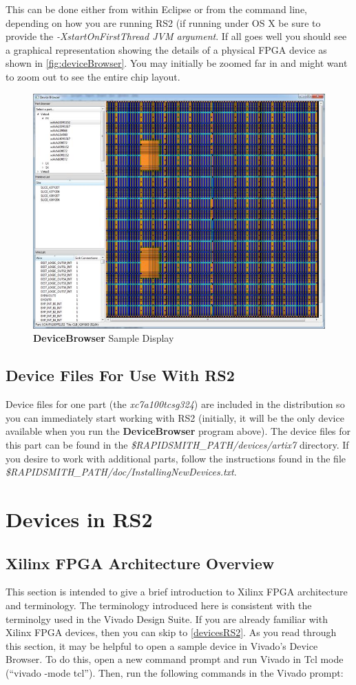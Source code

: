\documentclass[10pt]{article}
\newcommand{\fil}[1]{{\em #1}}
\newcommand{\opt}[1]{{\em #1}}
\newcommand{\pgm}[1]{{\textbf{#1}}}
\newcommand{\dir}[1]{{\em #1}}
\begin{document}
\noindent This can be done either from within Eclipse or from the command line,
depending on how you are running RS2 (if running under OS X be sure to provide the
\opt{-XstartOnFirstThread JVM argument}. If all goes well you should see a
graphical representation showing the details of a physical FPGA device as shown
in \autoref{fig:deviceBrowser}.  You may initially be zoomed far in and might
want to zoom out to see the entire chip layout.

\begin{figure}[H]
\centering
\includegraphics[width=0.8\columnwidth]{deviceBrowser}
\caption{\pgm{DeviceBrowser} Sample Display}
\label{fig:deviceBrowser}
\end{figure}

\subsection{Device Files For Use With RS2}
Device files for one part (the {\em xc7a100tcsg324}) are included in the
distribution so you can immediately start working with RS2 (initially, it
will be the only device available when you run the \pgm{DeviceBrowser} program
above).  The device files for this part can be found in the
\dir{\${RAPIDSMITH\_PATH}/devices/artix7} directory. If you desire to work with
additional parts, follow the instructions found in the file
\fil{\$RAPIDSMITH\_PATH/\-doc/Installing\-NewDevices.txt}.

\clearpage
\section{Devices in RS2}

\subsection{Xilinx FPGA Architecture Overview} \label{fpgaArch}
This section is intended to give a brief introduction to Xilinx FPGA
architecture and terminology. The terminology introduced here is consistent
with the terminolgy used in the Vivado Design Suite. If you are already familiar
with Xilinx FPGA devices, then you can skip to \autoref{devicesRS2}. 
As you read through this section, it may be helpful to open a sample device in Vivado's
Device Browser. To do this, open a new command prompt and run Vivado in Tcl mode
(``vivado -mode tcl''). Then, run the following commands in the Vivado prompt:
\end{document}
